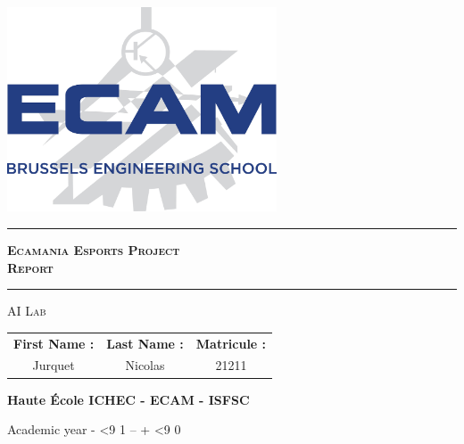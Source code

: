 \begin{titlepage}
    \begin{center}
        \vspace*{1cm}
        \includegraphics[width=0.6\textwidth]{figures/ECAM_logo.jpg}\\
        
        \vspace{3cm}

        \setlength{\parskip}{0pt}
        \hrule
        \vspace{0.5cm}
        \huge
        \textsc{\textbf{Ecamania Esports Project\\Report}}\\
        \vspace{0.5cm}
        \hrule
        
        \vspace{1cm}
        
        \LARGE
        \textsc{AI Lab}\\

        \vspace{2cm}

        \large
        \setlength{\tabcolsep}{10pt}
        \renewcommand{\arraystretch}{1.5}
        \begin{tabular}{ccc}
            \textbf{First Name :} & \textbf{Last Name :} & \textbf{Matricule :} \\
            Jurquet & Nicolas & 21211
        \end{tabular}

        \vfill
        
        \textbf{Haute École ICHEC - ECAM - ISFSC}\\
        \medskip

        \newcommand{\yearOne}{
            \the\numexpr \the\year - \ifnum\month<9 1\else 0\fi\relax
        }
        \newcommand{\yearTwo}{
            \the\numexpr \the\year + \ifnum\month<9 0\fi\relax
        }
        Academic year \yearOne\space --\yearTwo
    \end{center}
\end{titlepage}
